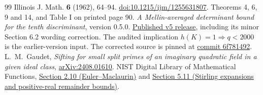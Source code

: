 \documentclass[11pt]{article}
\begin{document}
\begin{thebibliography}{99}
Illinois J. Math. \textbf{6} (1962), 64--94.
\href{https://doi.org/10.1215/ijm/1255631807}{doi:10.1215/ijm/1255631807}.
Theorems 4, 6, 9 and 14, and Table I on printed page 90.
 \emph{A Mellin-averaged determinant bound for the tenth
discriminant}, version 0.5.0.
\href{https://github.com/twinheterodox/tenth-discriminant/releases/tag/v0.5.0}{Published v5 release},
including its minor Section 6.2 wording correction. The audited
implication \(h(K)=1\Rightarrow q<2000\) is the earlier-version input.
The corrected source is pinned at
\href{https://github.com/twinheterodox/tenth-discriminant/tree/6f781492afd06de32997c2c89d4e228a78bab7fc/versions/v5}{commit 6f781492}.
 L.~M.~Gaudet, \emph{Sifting for small split primes of
an imaginary quadratic field in a given ideal class},
\href{https://arxiv.org/abs/2408.01610}{arXiv:2408.01610}.
 NIST Digital Library of Mathematical Functions,
\href{https://dlmf.nist.gov/2.10}{Section 2.10 (Euler--Maclaurin)} and
\href{https://dlmf.nist.gov/5.11}{Section 5.11 (Stirling expansions
and positive-real remainder bounds)}.
\end{thebibliography}
\end{document}
